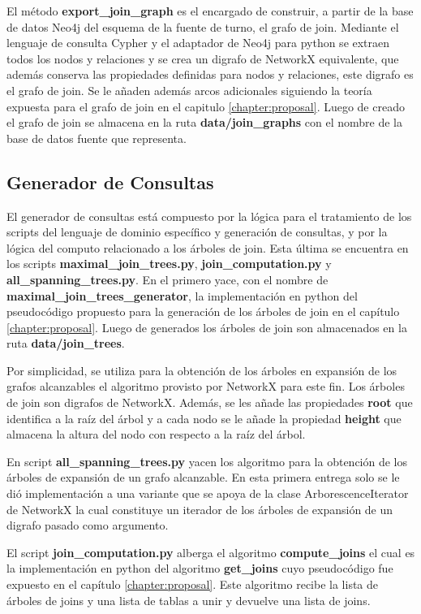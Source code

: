 El método \textbf{export\_join\_graph} es el encargado de construir, a partir de la base de datos Neo4j del esquema 
de la fuente de turno, el grafo de join. Mediante el lenguaje de consulta Cypher y el adaptador de Neo4j para python 
se extraen todos los nodos y relaciones y se crea un digrafo de NetworkX equivalente, que además conserva las 
propiedades definidas para nodos y relaciones, este digrafo es el grafo de join. Se le añaden además arcos 
adicionales siguiendo la teoría expuesta para el grafo de join en el capitulo \ref{chapter:proposal}. Luego 
de creado el grafo de join se almacena en la ruta \textbf{data/join\_graphs} con el nombre de la base de datos fuente 
que representa.


\subsection{Generador de Consultas}

El generador de consultas est\'a compuesto por la lógica para el tratamiento de los scripts del lenguaje de 
dominio específico y generación de consultas, y por la lógica del computo relacionado a los \'arboles de join. 
Esta \'ultima se encuentra en los scripts \textbf{maximal\_join\_trees.py}, \textbf{join\_computation.py} y 
\textbf{all\_spanning\_trees.py}. En el primero yace, con el nombre de \textbf{maximal\_join\_trees\_generator}, 
la implementación en python del pseudoc\'odigo propuesto para la generación de los \'arboles de join en el 
capítulo \ref{chapter:proposal}. Luego de generados los árboles de join son almacenados en la ruta 
\textbf{data/join\_trees}.

Por simplicidad, se utiliza para la obtención de los \'arboles en expansión de los grafos alcanzables el algoritmo 
provisto por NetworkX para este fin. Los \'arboles de join son digrafos de NetworkX. Además, se les añade las propiedades 
\textbf{root} que identifica a la raíz del \'arbol y a cada nodo se le añade la propiedad \textbf{height} que almacena 
la altura del nodo con respecto a la raíz del \'arbol.

En script \textbf{all\_spanning\_trees.py} yacen los algoritmo para la obtención de los \'arboles de expansión 
de un grafo alcanzable. En esta primera entrega solo se le di\'o implementación a una variante que se apoya de la 
clase ArborescenceIterator de NetworkX la cual constituye un iterador de los \'arboles de expansión de un digrafo 
pasado como argumento.

El script \textbf{join\_computation.py} alberga el algoritmo \textbf{compute\_joins} el cual es la implementación 
en python del algoritmo \textbf{get\_joins} cuyo pseudoc\'odigo fue expuesto en el capítulo \ref{chapter:proposal}. 
Este algoritmo recibe la lista de \'arboles de joins y una lista de tablas a unir y devuelve una lista de joins.

